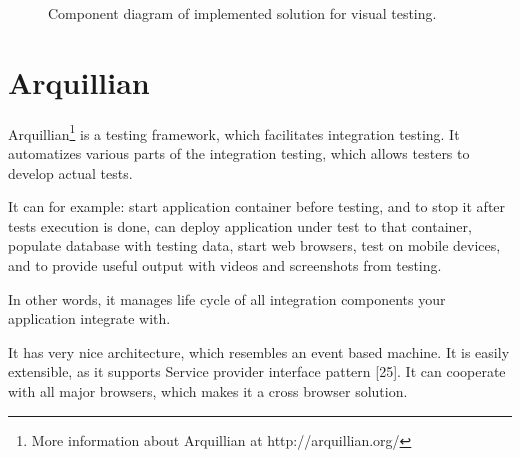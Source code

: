 \documentclass[11pt,oneside,final]{fithesis2}
\begin{document}
\begin{figure}[!htb]
    \begin{center}
    \leavevmode
    \centerline{}
    \end{center}
    \caption{Component diagram of implemented solution for visual testing.}
    \label{fig:componentDiagramOfImpl}
\end{figure}
  
\section{Arquillian}
Arquillian\footnote{More information about Arquillian at http://arquillian.org/} is a testing framework, which facilitates integration testing. It automatizes various parts
of the integration testing, which allows testers to develop actual tests.

It can for example: start application container before testing, and to stop it after tests execution 
is done, can deploy application under test to that container, populate database with testing data, 
start web browsers, test on mobile devices, and to provide useful output with videos and screenshots 
from testing.

In other words, it manages life cycle of all integration components your application integrate with.

It has very nice architecture, which resembles an event based machine. It is easily extensible, as it
supports Service provider interface pattern [25]. It can cooperate with all major browsers, which makes
it a cross browser solution. 
\end{document}
